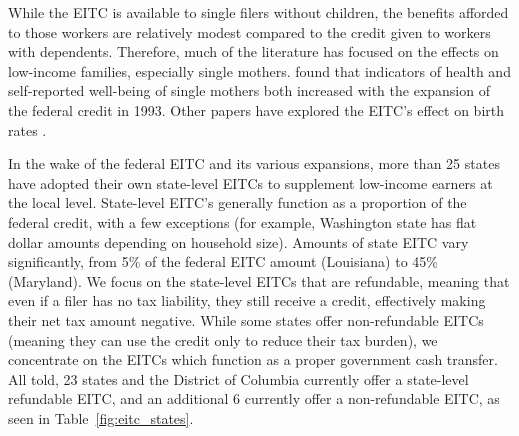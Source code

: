 \documentclass{article}
\begin{document}
While the EITC is available to single filers without children, the benefits afforded to those workers are relatively modest compared to the credit given to workers with dependents. Therefore, much of the literature has focused on the effects on low-income families, especially single mothers. \cite{ evans2014giving} found that indicators of health and self-reported well-being of single mothers both increased with the expansion of the federal credit in 1993. Other papers have explored the EITC’s effect on birth rates \citep{baughman2003did}.

In the wake of the federal EITC and its various expansions, more than 25 states have adopted their own state-level EITCs to supplement low-income earners at the local level. State-level EITC’s generally function as a proportion of the federal credit, with a few exceptions (for example, Washington state has flat dollar amounts depending on household size). Amounts of state EITC vary significantly, from 5\% of the federal EITC amount (Louisiana) to 45\% (Maryland). We focus on the state-level EITCs that are refundable, meaning that even if a filer has no tax liability, they still receive a credit, effectively making their net tax amount negative. While some states offer non-refundable EITCs (meaning they can use the credit only to reduce their tax burden), we concentrate on the EITCs which function as a proper government cash transfer. All told, 23 states and the District of Columbia currently offer a state-level refundable EITC, and an additional 6 currently offer a non-refundable EITC, as seen in Table~\ref{fig:eitc_states}.
\end{document}
